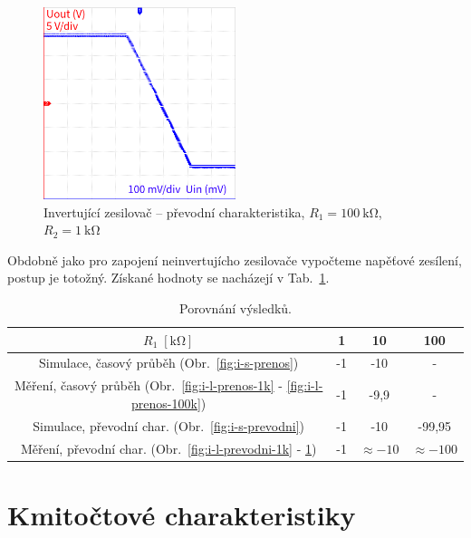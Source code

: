 \documentclass{protokol}
\begin{document}
		
	
	
	\begin{figure}[h!]
		\centering
		\includegraphics[width=0.5\textwidth]{oscilo/output16.png}
		\centering
		\caption{Invertující zesilovač -- převodní charakteristika, $R_1=\SI{100}{\kilo\ohm}$, $R_2=\SI{1}{\kilo\ohm}$}
		\label{fig:i-l-prevodni-100k}
	\end{figure}
	
	
	Obdobně jako pro zapojení neinvertujícho zesilovače vypočteme napěťové zesílení, postup je totožný. Získané hodnoty se nacházejí v Tab.~\ref{tab:hodnoty-zesileni-i}.
	
	\begin{table}[h!]
		\centering
		\def\arraystretch{1.4}
		\centering
		\begin{tabular}{|c|c|c|c|}	
			\hline
			$R_1 \; [\unit{\kilo\ohm}]$ & 1 & 10 & 100 \\ [0.1ex]
			\hline
			Simulace, časový průběh (Obr.~\ref{fig:i-s-prenos})   & -1  & -10 & -\\ [0.1ex]
			\hline 
			Měření, časový průběh (Obr.~\ref{fig:i-l-prenos-1k} - \ref{fig:i-l-prenos-100k}) & -1 & -9,9 &  -\\[0.1ex]
			\hline
			Simulace, převodní char. (Obr.~\ref{fig:i-s-prevodni})   & -1 & -10 & -99,95\\ [0.1ex]
			\hline 
			Měření, převodní char. (Obr.~\ref{fig:i-l-prevodni-1k} - \ref{fig:i-l-prevodni-100k})   & -1 & $ \approx -10 $ & $ \approx -100$\\ [0.1ex]
			\hline 
		\end{tabular}
		\caption{Porovnání výsledků.}
		\label{tab:hodnoty-zesileni-i}
	\end{table}
	
\clearpage	
\section{Kmitočtové charakteristiky}	
	
\end{document}
